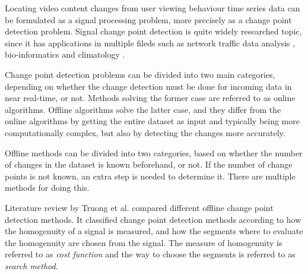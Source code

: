 
Locating video content changes from user viewing behaviour time series data can be formulated as a signal processing problem, more precisely as a change point detection problem. Signal change point detection is quite widely researched topic, since it has applications in multiple fileds such as network traffic data analysis \cite{levy-leducDetectionLocalizationChangepoints2009} \cite{lung-yut-fongDistributedDetectionLocalization2012}, bio-informatics \cite{liuChangepointDetectionMethod2018} \cite{vertFastDetectionMultiple2010} and climatology \cite{reevesReviewComparisonChangepoint2007} \cite{verbesseltDetectingTrendSeasonal2010a}.

Change point detection problems can be divided into two main categories, depending on whether the change detection must be done for incoming data in near real-time, or not. Methods solving the former case are referred to as online algorithms. Offline algorithms solve the latter case, and they differ from the online algorithms by getting the entire dataset as input and typically being more computationally complex, but also by detecting the changes more accurately.

Offline methods can be divided into two categories, based on whether the number of changes in the dataset is known beforehand, or not. If the number of change points is not known, an extra step is needed to determine it. There are multiple methods for doing this.

Literature review by Truong et al. \cite{truongSelectiveReviewOffline2020} compared different offline change point detection methods. It classified change point detection methods according to how the homogenuity of a signal is measured, and how the segments where to evaluate the homogenuity are chosen from the signal. The measure of homogenuity is referred to as \textit{cost function} and the way to choose the segments is referred to as \textit{search method}.

